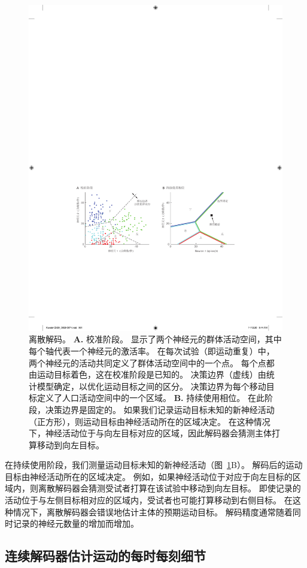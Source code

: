 \begin{figure}[htbp]
	\centering
	\includegraphics[width=0.75\linewidth]{chap39/fig_39_5}
	\caption{离散解码。
		\textbf{A.} 校准阶段。
		显示了两个神经元的群体活动空间，其中每个轴代表一个神经元的激活率。
		在每次试验（即运动重复）中，两个神经元的活动共同定义了群体活动空间中的一个点。
		每个点都由运动目标着色，这在校准阶段是已知的。 
		决策边界（虚线）由统计模型确定，以优化运动目标之间的区分。
		决策边界为每个移动目标定义了人口活动空间中的一个区域。
		\textbf{B.} 持续使用相位。
		在此阶段，决策边界是固定的。
		如果我们记录运动目标未知的新神经活动（正方形），则运动目标由神经活动所在的区域决定。
		在这种情况下，神经活动位于与向左目标对应的区域，因此解码器会猜测主体打算移动到向左目标。}
	\label{fig:39_5}
\end{figure}



在持续使用阶段，我们测量运动目标未知的新神经活动（图~\ref{fig:39_5}B）。
解码后的运动目标由神经活动所在的区域决定。
例如，如果神经活动位于对应于向左目标的区域内，则离散解码器会猜测受试者打算在该试验中移动到向左目标。 
即使记录的活动位于与左侧目标相对应的区域内，受试者也可能打算移动到右侧目标。
在这种情况下，离散解码器会错误地估计主体的预期运动目标。
解码精度通常随着同时记录的神经元数量的增加而增加。



\subsection{连续解码器估计运动的每时每刻细节}

